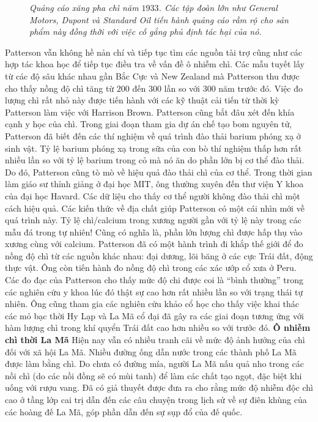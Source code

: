 \begin{multicols}{2}
\begin{figure}[H]
		\caption{\small\textit{\color{timhieukhoahoc}Quảng cáo xăng pha chì năm $1933$. Các tập đoàn lớn như General Motors, Dupont và Standard Oil tiến hành quảng cáo rầm rộ cho sản phẩm này đồng thời với việc cố gắng phủ định tác hại của nó.}}
		\vspace*{-10pt}
	\end{figure}
	Patterson vẫn không hề nản chí và tiếp tục tìm các nguồn tài trợ cũng như các hợp tác khoa học để tiếp tục điều tra về vấn đề ô nhiễm chì. Các mẫu tuyết lấy từ các độ sâu khác nhau gần Bắc Cực và New Zealand mà Patterson thu được cho thấy nồng độ chì tăng từ $200$ đến $300$ lần so với $300$ năm trước đó. Việc đo lượng chì rất nhỏ này được tiến hành với các kỹ thuật cải tiến từ thời kỳ Patterson làm việc với Harrison Brown. Patterson cũng bắt đâu xét đến khía cạnh y học của chì. Trong giai đoạn tham gia dự án chế tạo bom nguyên tử, Patterson đã biết đến các thí nghiệm về quá trình đào thải barium phóng xạ ở sinh vật. Tỷ lệ barium phóng xạ trong sữa của con bò thí nghiệm thấp hơn rất nhiều lần so với tỷ lệ barium trong cỏ mà nó ăn do phần lớn bị cơ thể đào thải. Do đó, Patterson cũng tò mò về hiệu quả đào thải chì của cơ thể. Trong thời gian làm giáo sư thỉnh giảng ở đại học MIT, ông thường xuyên đến thư viện Y khoa của đại học Havard. Các dữ liệu cho thấy cơ thể người không đào thải chì một cách hiệu quả. Các kiến thức về địa chất giúp Patterson có một cái nhìn mới về quá trình này. Tỷ lệ chì/calcium trong xương người gần với tỷ lệ này trong các mẫu đá trong tự nhiên! Cũng có nghĩa là, phần lớn lượng chì được hấp thụ vào xương cùng với calcium.
	\vskip 0.1cm
	Patterson đã có một hành trình đi khắp thế giới để đo nồng độ chì từ các nguồn khác nhau: đại dương, lõi băng ở các cực Trái đất, động thực vật. Ông còn tiến hành đo nồng độ chì trong các xác ướp cổ xưa ở Peru. Các đo đạc của Patterson cho thấy mức độ chi được coi là “bình thường” trong các nghiên cứu y khoa lúc đó thật sự cao hơn rất nhiều lần so với trạng thái tự nhiên. Ông cũng tham gia các nghiên cứu khảo cổ học cho thấy việc khai thác các mỏ bạc thời Hy Lạp và La Mã cổ đại đã gây ra các giai đoạn tương ứng với hàm lượng chì trong khí quyển Trái đất cao hơn nhiều so với trước đó.
	\vskip 0.1cm
	\textbf{\color{timhieukhoahoc}Ô nhiễm chì thời La Mã}
	\vskip 0.1cm
	Hiện nay vẫn có nhiều tranh cãi về mức độ ảnh hưởng của chì đối với xã hội La Mã. Nhiều đường ống dẫn nước trong các thành phố La Mã được làm bằng chì. Do chưa có đường mía, người La Mã nấu quả nho trong các nồi chì (do các nồi đồng sẽ có mùi tanh) để làm các chất tạo ngọt, đặc biệt khi uống với rượu vang. Đã có giả thuyết được đưa ra cho rằng mức độ nhiễm độc chì cao ở tầng lớp cai trị dẫn đến các câu chuyện trong lịch sử về sự điên khùng của các hoàng đế La Mã, góp phần dẫn đến sự sụp đổ của đế quốc. 

\end{multicols}

